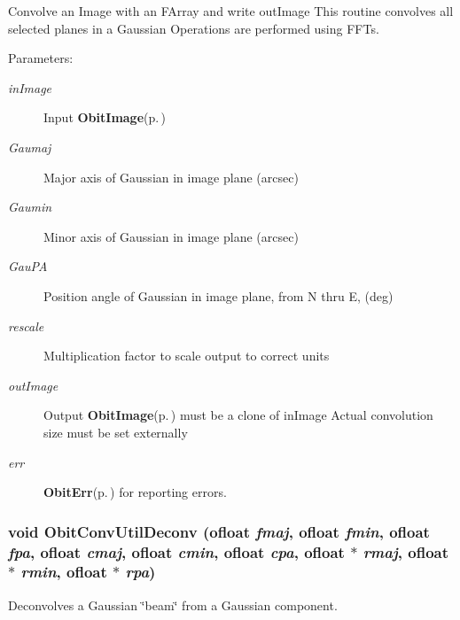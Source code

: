Convolve an Image with an FArray and write out\-Image This routine convolves all selected planes in a Gaussian Operations are performed using FFTs. 

\begin{Desc}
\item[Parameters:]
\begin{description}
\item[{\em in\-Image}]Input {\bf Obit\-Image}{\rm (p.\,\pageref{structObitImage})} \item[{\em Gaumaj}]Major axis of Gaussian in image plane (arcsec) \item[{\em Gaumin}]Minor axis of Gaussian in image plane (arcsec) \item[{\em Gau\-PA}]Position angle of Gaussian in image plane, from N thru E, (deg) \item[{\em rescale}]Multiplication factor to scale output to correct units \item[{\em out\-Image}]Output {\bf Obit\-Image}{\rm (p.\,\pageref{structObitImage})} must be a clone of in\-Image Actual convolution size must be set externally \item[{\em err}]{\bf Obit\-Err}{\rm (p.\,\pageref{structObitErr})} for reporting errors. \end{description}
\end{Desc}
\subsubsection{\setlength{\rightskip}{0pt plus 5cm}void Obit\-Conv\-Util\-Deconv ({\bf ofloat} {\em fmaj}, {\bf ofloat} {\em fmin}, {\bf ofloat} {\em fpa}, {\bf ofloat} {\em cmaj}, {\bf ofloat} {\em cmin}, {\bf ofloat} {\em cpa}, {\bf ofloat} $\ast$ {\em rmaj}, {\bf ofloat} $\ast$ {\em rmin}, {\bf ofloat} $\ast$ {\em rpa})}\label{ObitConvUtil_8h_a3}


Deconvolves a Gaussian \char`\"{}beam\char`\"{} from a Gaussian component. 

